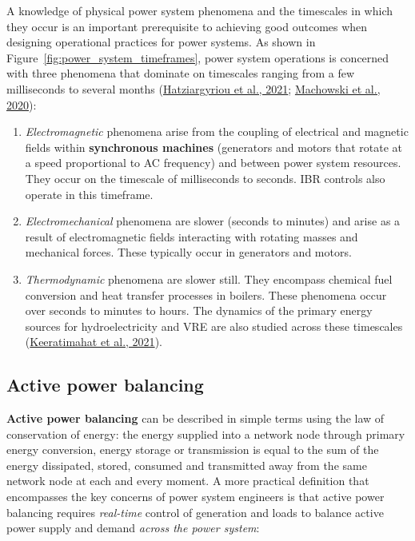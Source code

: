 \documentclass[12pt,a4paper,]{report}
\begin{document}
A knowledge of physical power system phenomena and the timescales in
which they occur is an important prerequisite to achieving good outcomes
when designing operational practices for power systems. As shown in
Figure~\ref{fig:power_system_timeframes}, power system operations is
concerned with three phenomena that dominate on timescales ranging from
a few milliseconds to several months
(\protect\hyperlink{ref-hatziargyriouDefinitionClassificationPower2021}{Hatziargyriou
et al., 2021};
\protect\hyperlink{ref-machowskiPowerSystemDynamics2020}{Machowski et
al., 2020}):

\begin{enumerate}
\def\labelenumi{\arabic{enumi}.}
\item
  \emph{Electromagnetic} phenomena arise from the coupling of electrical
  and magnetic fields within \textbf{synchronous machines} (generators
  and motors that rotate at a speed proportional to AC frequency) and
  between power system resources. They occur on the timescale of
  milliseconds to seconds. IBR controls also operate in this timeframe.
\item
  \emph{Electromechanical} phenomena are slower (seconds to minutes) and
  arise as a result of electromagnetic fields interacting with rotating
  masses and mechanical forces. These typically occur in generators and
  motors.
\item
  \emph{Thermodynamic} phenomena are slower still. They encompass
  chemical fuel conversion and heat transfer processes in boilers. These
  phenomena occur over seconds to minutes to hours. The dynamics of the
  primary energy sources for hydroelectricity and VRE are also studied
  across these timescales
  (\protect\hyperlink{ref-keeratimahatAnalysisShorttermOperational2021}{Keeratimahat
  et al., 2021}).
\end{enumerate}

\hypertarget{sec:lit_review-balancing}{%
\subsection{Active power balancing}\label{sec:lit_review-balancing}}

\textbf{Active power balancing} can be described in simple terms using
the law of conservation of energy: the energy supplied into a network
node through primary energy conversion, energy storage or transmission
is equal to the sum of the energy dissipated, stored, consumed and
transmitted away from the same network node at each and every moment. A
more practical definition that encompasses the key concerns of power
system engineers is that active power balancing requires
\emph{real-time} control of generation and loads to balance active power
supply and demand \emph{across the power system}:
\end{document}
